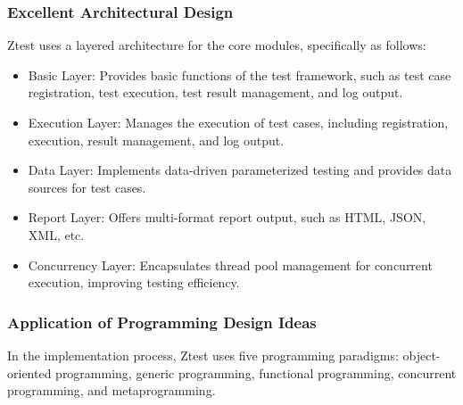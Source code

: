 \documentclass{article}
\begin{document}
\subsubsection{Excellent Architectural Design}
Ztest uses a layered architecture for the core modules, specifically as follows:
\begin{itemize}
    \item Basic Layer: Provides basic functions of the test framework, such as test case registration, test execution, test result management, and log output.
    \item Execution Layer: Manages the execution of test cases, including registration, execution, result management, and log output.
    \item Data Layer: Implements data-driven parameterized testing and provides data sources for test cases.
    \item Report Layer: Offers multi-format report output, such as HTML, JSON, XML, etc.
    \item Concurrency Layer: Encapsulates thread pool management for concurrent execution, improving testing efficiency.
\end{itemize}
\subsubsection{Application of Programming Design Ideas}
In the implementation process, Ztest uses five programming paradigms: object-oriented programming, generic programming, functional programming, concurrent programming, and metaprogramming.
\end{document}
